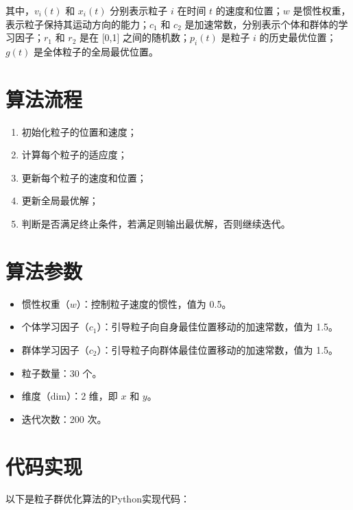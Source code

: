 \documentclass{ctexart}
\begin{document}
其中，$v_{i}(t)$ 和 $x_{i}(t)$ 分别表示粒子 $i$ 在时间 $t$ 的速度和位置；$w$ 是惯性权重，表示粒子保持其运动方向的能力；$c_{1}$ 和 $c_{2}$ 是加速常数，分别表示个体和群体的学习因子；$r_{1}$ 和 $r_{2}$ 是在 [0,1] 之间的随机数；$p_{i}(t)$ 是粒子 $i$ 的历史最优位置；$g(t)$ 是全体粒子的全局最优位置。

\section{算法流程}
\begin{enumerate}
    \item 初始化粒子的位置和速度；
    \item 计算每个粒子的适应度；
    \item 更新每个粒子的速度和位置；
    \item 更新全局最优解；
    \item 判断是否满足终止条件，若满足则输出最优解，否则继续迭代。
\end{enumerate}

\section{算法参数}
\begin{itemize}
    \item 惯性权重（$w$）：控制粒子速度的惯性，值为 0.5。
    \item 个体学习因子（$c_1$）：引导粒子向自身最佳位置移动的加速常数，值为 1.5。
    \item 群体学习因子（$c_2$）：引导粒子向群体最佳位置移动的加速常数，值为 1.5。
    \item 粒子数量：30 个。
    \item 维度（dim）：2 维，即 $x$ 和 $y$。
    \item 迭代次数：200 次。
\end{itemize}

\section{代码实现}
以下是粒子群优化算法的Python实现代码：
\end{document}
